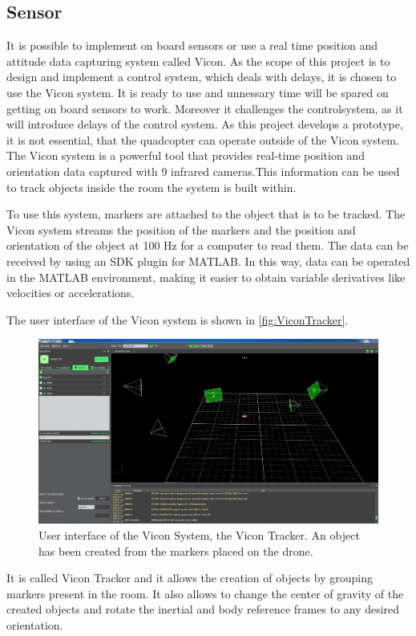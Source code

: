 \subsection{Sensor}
It is possible to implement on board sensors or use a real time position and attitude data capturing system called Vicon. 
As the scope of this project is to design and implement a control system, which deals with delays, it is chosen to use the Vicon system. It is ready to use and unnessary time will be spared on getting on board sensors to work. Moreover it challenges the controlsystem, as it will introduce delays of the control system. As this project develops a prototype, it is not essential, that the quadcopter can operate outside of the Vicon system.\\

The Vicon system is a powerful tool that provides real-time position and orientation data captured with 9 infrared cameras.This information can be used to track objects inside the room the system is built within.


To use this system, markers are attached to the object that is to be tracked. The Vicon system streams the position of the markers and the position and orientation of the object at 100 Hz for a computer to read them. The data can be received by using an SDK plugin for MATLAB. In this way, data can be operated in the MATLAB environment, making it easier to obtain variable derivatives like velocities or accelerations.

The user interface of the Vicon system is shown in \autoref{fig:ViconTracker}. 
\begin{figure}[H]
	\centering
	\includegraphics[scale=0.27]{figures/ViconTracker}
	\caption{User interface of the Vicon System, the Vicon Tracker. An object has been created from the markers placed on the drone.}
	\label{fig:ViconTracker}
\end{figure}
It is called Vicon Tracker and it allows the creation of objects by grouping markers present in the room. It also allows to change the center of gravity of the created objects and rotate the inertial and body reference frames to any desired orientation.


